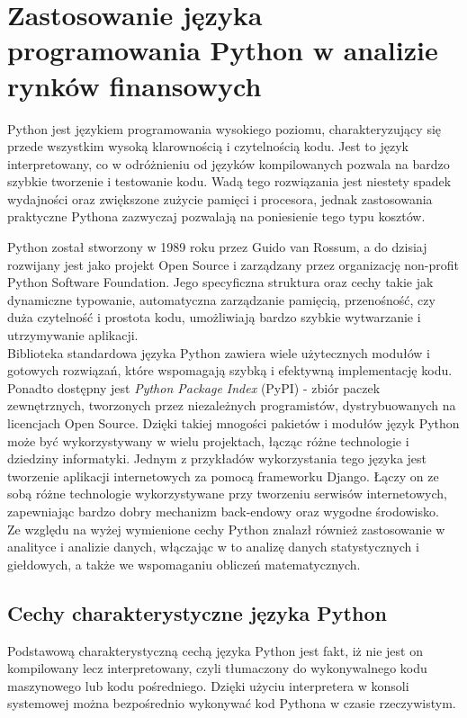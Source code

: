 
\chapter{Zastosowanie języka programowania Python w analizie rynków finansowych}
Python jest językiem programowania wysokiego poziomu, charakteryzujący się przede wszystkim wysoką klarownością i czytelnością kodu.
Jest to język interpretowany, co w odróżnieniu od języków kompilowanych pozwala na bardzo szybkie tworzenie i testowanie kodu.
Wadą tego rozwiązania jest niestety spadek wydajności oraz zwiększone zużycie pamięci i procesora, jednak zastosowania praktyczne Pythona zazwyczaj pozwalają na poniesienie tego typu kosztów.

Python został stworzony w 1989 roku przez Guido van Rossum, a do dzisiaj rozwijany jest jako projekt Open Source i zarządzany przez organizację non-profit Python Software Foundation.
Jego specyficzna struktura oraz cechy takie jak dynamiczne typowanie, automatyczna zarządzanie pamięcią, przenośność, czy duża czytelność i prostota kodu, 
umożliwiają bardzo szybkie wytwarzanie i utrzymywanie aplikacji.\\

Biblioteka standardowa języka Python zawiera wiele użytecznych modułów i gotowych rozwiązań, które wspomagają szybką i efektywną implementację kodu.
Ponadto dostępny jest \textit{Python Package Index} (PyPI) - zbiór paczek zewnętrznych, tworzonych przez niezależnych programistów, dystrybuowanych na licencjach Open Source.
Dzięki takiej mnogości pakietów i modułów język Python może być wykorzystywany w wielu projektach, łącząc różne technologie i dziedziny informatyki.
Jednym z przykładów wykorzystania tego języka jest tworzenie aplikacji internetowych za pomocą frameworku Django.
Łączy on ze sobą różne technologie wykorzystywane przy tworzeniu serwisów internetowych, zapewniając bardzo dobry mechanizm back-endowy oraz wygodne środowisko.\\

Ze względu na wyżej wymienione cechy Python znalazł również zastosowanie w analityce i analizie danych, włączając w to analizę danych statystycznych i giełdowych, a także we wspomaganiu obliczeń matematycznych.


\section{Cechy charakterystyczne języka Python}
Podstawową charakterystyczną cechą języka Python jest fakt, iż nie jest on kompilowany lecz interpretowany, czyli tłumaczony do wykonywalnego kodu maszynowego lub kodu pośredniego.
Dzięki użyciu interpretera w konsoli systemowej można bezpośrednio wykonywać kod Pythona w czasie rzeczywistym.


